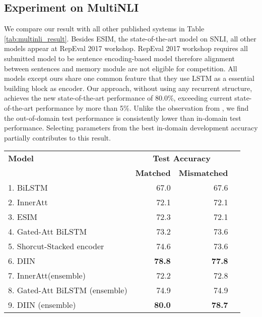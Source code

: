 \documentclass{article} \usepackage{iclr2018_conference,times}
\begin{document}
\subsection{Experiment on MultiNLI}
We compare our result with all other published systems in Table \ref{tab:multinli_result}. Besides ESIM, the state-of-the-art model on SNLI, all other models appear at RepEval 2017 workshop. RepEval 2017 workshop requires all submitted model to be sentence encoding-based model therefore alignment between sentences and memory module are not eligible for competition. All models except ours share one common feature that they use LSTM as a essential building block as encoder. Our approach, without using any recurrent structure, achieves the new state-of-the-art performance of 80.0\%, exceeding current state-of-the-art performance by more than 5\%. Unlike the observation from \citet{repeval2017_Nangia:2017tc}, we find the out-of-domain test performance is consistently lower than in-domain test performance. Selecting parameters from the best in-domain development accuracy partially contributes to this result.

\begin{table*}
\centering
\small
\begin{tabular}{l r r r}
\toprule
{\bf Model} & 
\multicolumn{2}{c}{\bf Test Accuracy} \\

{}    & {\bf Matched} & {\bf Mismatched} \\
\midrule
1. BiLSTM\citep{MultiNLI_Williams:2017tk} & 67.0 & 67.6 \\
2. InnerAtt\citep{inner_att_Balazs:2017wa} & 72.1 & 72.1 \\ 
3. ESIM\citep{MultiNLI_Williams:2017tk} & 72.3 & 72.1 \\
4. Gated-Att BiLSTM\citep{gated_att_bilstm_2017arXiv170801353C} & 73.2 & 73.6 \\
5. Shorcut-Stacked encoder\citep{stack_lstm_2017arXiv170802312N} & 74.6 & 73.6 \\
6. DIIN & \textbf{78.8} & \textbf{77.8}\\
\midrule
7. InnerAtt(ensemble) & 72.2 & 72.8 \\
8. Gated-Att BiLSTM (ensemble) & 74.9 & 74.9\\
9. DIIN (ensemble) & \textbf{80.0} & \textbf{78.7}\\
\bottomrule
\end{tabular}

\caption{MultiNLI result.\label{tab:multinli_result}}
\end{table*}
\end{document}
